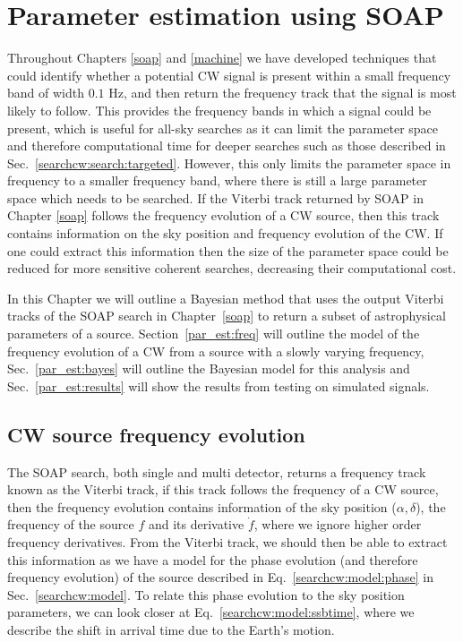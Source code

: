 \chapter{\label{par_est}Parameter estimation using SOAP}

Throughout Chapters \ref{soap} and \ref{machine} we have developed
techniques that could identify whether a potential \gls{CW}
signal is present within a small frequency band of width $0.1$ Hz, and then
return the frequency track that the signal is most likely to follow.  This
provides the frequency bands in which a signal could be present, which is useful
for all-sky searches as it can limit the parameter space and therefore
computational time for deeper searches such as those described in
Sec.~\ref{searchcw:search:targeted}.  However, this only limits the parameter
space in frequency to a smaller frequency band, where there is still a large
parameter space which needs to be searched.  If the Viterbi track returned by
SOAP in Chapter \ref{soap} follows the frequency evolution of a \gls{CW}
source, then this track contains information on the sky position and frequency
evolution of the \gls{CW}.  If one could extract this information then the size
of the parameter space could be reduced for more sensitive coherent searches, decreasing their computational cost.

In this Chapter we will outline a Bayesian method that uses the output Viterbi tracks of the SOAP search in Chapter~\ref{soap} to return a subset of astrophysical parameters of a
source.  Section~\ref{par_est:freq} will outline the model of the frequency
evolution of a \gls{CW} from a source with a slowly varying frequency,
Sec.~\ref{par_est:bayes} will outline the Bayesian model for this analysis and
Sec.~\ref{par_est:results} will show the results from testing on simulated
signals.

\section{\label{par_est:freq}\gls{CW} source frequency evolution}

The SOAP search, both single and multi detector, returns a frequency track known as the Viterbi track, if this
track follows the frequency of a \gls{CW} source, then the frequency evolution
contains information of the sky position ($\alpha, \delta$), the frequency of
the source $f$ and its derivative $\dot{f}$, where we ignore higher order
frequency derivatives.  From the Viterbi track, we should then be able to
extract this information as we have a model for the phase evolution (and
therefore frequency evolution) of the source described in
Eq.~\ref{searchcw:model:phase} in Sec.~\ref{searchcw:model}.  To relate this
phase evolution to the sky position parameters, we can look closer at
Eq.~\ref{searchcw:model:ssbtime}, where we describe the shift in arrival time
due to the Earth's motion.

